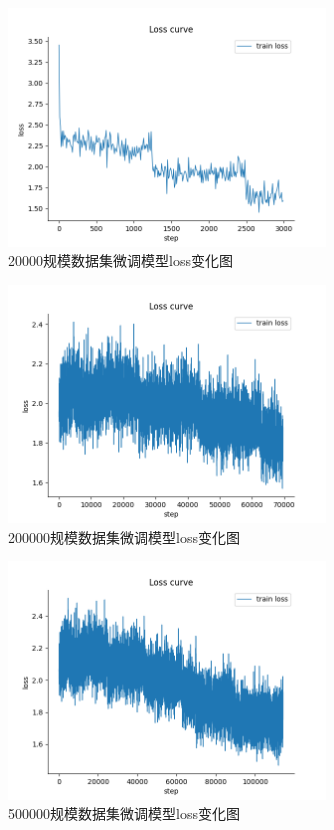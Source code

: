 \documentclass[
    decl-page,  %
    ,fontset = win, %
  ]{njuthesis}
\begin{document}
\begin{figure}[H]
  \centering
  \includegraphics[width=0.75\textwidth]{image/2w-loss.png}
  \caption{20000规模数据集微调模型loss变化图}
  \label{2w-loss}
\end{figure}

\begin{figure}[H]
  \centering
  \includegraphics[width=0.75\textwidth]{image/20w-loss.png}
  \caption{200000规模数据集微调模型loss变化图}
  \label{20w-loss}
\end{figure}

\begin{figure}[H]
  \centering
  \includegraphics[width=0.75\textwidth]{image/50w-loss.png}
  \caption{500000规模数据集微调模型loss变化图}
  \label{50w-loss}
\end{figure}
\end{document}
